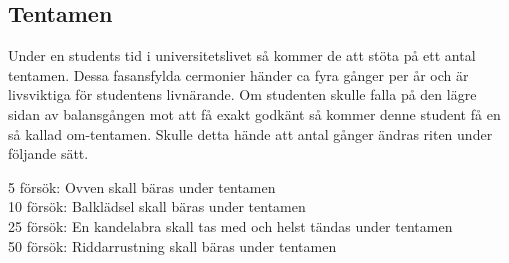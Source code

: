 \subsection*{\textbf{Tentamen}}
Under en students tid i universitetslivet så kommer de att stöta på ett antal tentamen. Dessa fasansfylda cermonier händer ca fyra gånger per år och är livsviktiga för studentens 
livnärande. Om studenten skulle falla på den lägre sidan av balansgången mot att få exakt godkänt så kommer denne student få en så kallad om-tentamen. Skulle detta hände att antal gånger 
ändras riten under följande sätt.


5 försök: Ovven skall bäras under tentamen\\
10 försök: Balklädsel skall bäras under tentamen\\
25 försök: En kandelabra skall tas med och helst tändas under tentamen\\
50 försök: Riddarrustning skall bäras under tentamen


\newpage